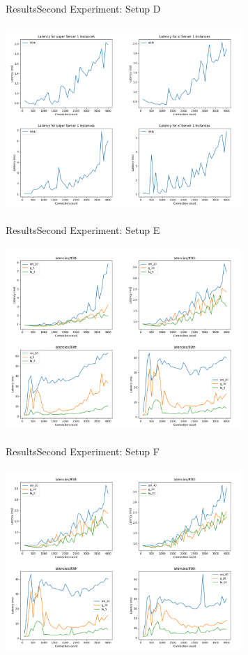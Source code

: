 \documentclass{beamer}
\begin{document}
\begin{frame}{Results}{Second Experiment: Setup D}
  \begin{center}
   \includegraphics[height=7cm, width=9cm]{figures/super1_xl1.png}
  \end{center}
\end{frame}

\begin{frame}{Results}{Second Experiment: Setup E}
  \begin{center}
   \includegraphics[height=7cm, width=9cm]{figures/multi1250_2500.png}
  \end{center}
\end{frame}

\begin{frame}{Results}{Second Experiment: Setup F}
  \begin{center}
   \includegraphics[height=7cm, width=9cm]{figures/multi2500_5000.png}
  \end{center}
\end{frame}
\end{document}
